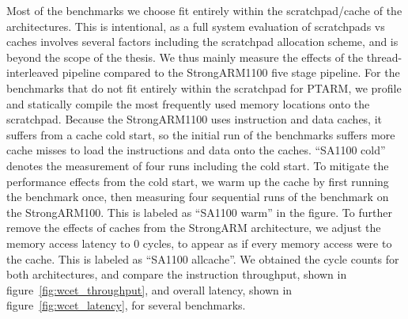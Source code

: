 Most of the benchmarks we choose fit entirely within the scratchpad/cache of the architectures.
This is intentional, as a full system evaluation of scratchpads vs caches involves several factors including the scratchpad allocation scheme, and is beyond the scope of the thesis.
We thus mainly measure the effects of the thread-interleaved pipeline compared to the StrongARM1100 five stage pipeline. 
For the benchmarks that do not fit entirely within the scratchpad for PTARM, we profile and statically compile the most frequently used memory locations onto the scratchpad.
Because the StrongARM1100 uses instruction and data caches, it suffers from a cache cold start, so the initial run of the benchmarks suffers more cache misses to load the instructions and data onto the caches. 
``SA1100 cold'' denotes the measurement of four runs including the cold start.  
To mitigate the performance effects from the cold start, we warm up the cache by first running the benchmark once, then measuring four sequential runs of the benchmark on the StrongARM100.  
This is labeled as ``SA1100 warm'' in the figure. 
To further remove the effects of caches from the StrongARM architecture, we adjust the memory access latency to 0 cycles, to appear as if every memory access were to the cache. 
This is labeled as ``SA1100 allcache''.
We obtained the cycle counts for both architectures, and compare the instruction throughput, shown in figure~\ref{fig:wcet_throughput}, and overall latency, shown in figure~\ref{fig:wcet_latency}, for several benchmarks.

